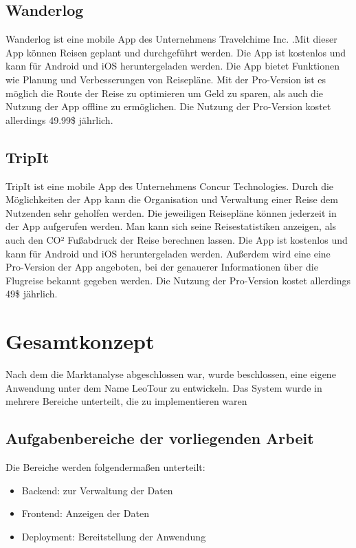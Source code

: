 \subsection{Wanderlog}
Wanderlog ist eine mobile App des Unternehmens Travelchime Inc. .Mit dieser App können Reisen geplant und durchgeführt werden. Die App ist kostenlos und kann für Android und iOS heruntergeladen werden. Die App bietet Funktionen wie Planung und Verbesserungen von Reisepläne. Mit der Pro-Version ist es möglich die Route der Reise zu optimieren um Geld zu sparen, als auch die Nutzung der App offline zu ermöglichen. Die Nutzung der Pro-Version kostet allerdings 49.99\$ jährlich.\cite{Sewell}


\subsection{TripIt}
TripIt ist eine mobile App des Unternehmens Concur Technologies. Durch die Möglichkeiten der App kann die Organisation und Verwaltung einer Reise dem Nutzenden sehr geholfen werden. Die jeweiligen Reisepläne können jederzeit in der App aufgerufen werden. Man kann sich seine Reisestatistiken anzeigen, als auch den CO² Fußabdruck der Reise berechnen lassen. Die App ist kostenlos und kann für Android und iOS heruntergeladen werden. Außerdem wird eine eine Pro-Version der App angeboten, bei der genauerer Informationen über die Flugreise bekannt gegeben werden. Die Nutzung der Pro-Version kostet allerdings 49\$ jährlich.
\cite{TripIt}


\section{Gesamtkonzept}

Nach dem die Marktanalyse abgeschlossen war, wurde beschlossen, eine eigene Anwendung unter dem Name LeoTour zu entwickeln. Das System wurde in mehrere Bereiche unterteilt, die zu implementieren waren

\subsection{Aufgabenbereiche der vorliegenden Arbeit}

Die Bereiche werden folgendermaßen unterteilt:

\begin{itemize}
    \item Backend: zur Verwaltung der Daten 
    \item Frontend: Anzeigen der Daten
    \item Deployment: Bereitstellung der Anwendung
\end{itemize}


